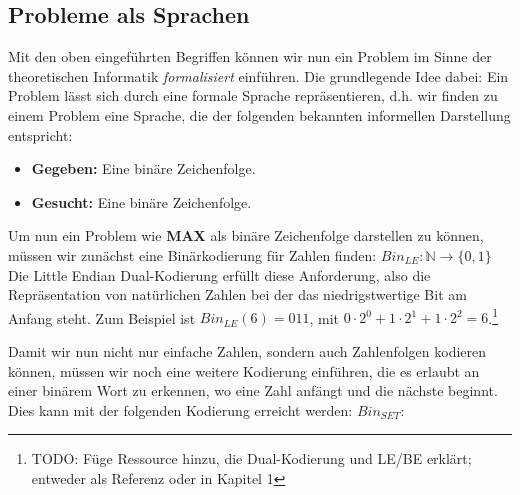 \subsection{Probleme als Sprachen}
Mit den oben eingeführten Begriffen können
wir nun ein Problem im Sinne der theoretischen Informatik
\emph{formalisiert} einführen.
Die grundlegende Idee dabei: Ein Problem lässt sich durch eine formale Sprache repräsentieren,
d.h. wir finden zu einem Problem eine Sprache, die der folgenden bekannten informellen
Darstellung entspricht:
\begin{itemize}
    \item \textbf{Gegeben:} Eine binäre Zeichenfolge. 
    \item \textbf{Gesucht:} Eine binäre Zeichenfolge.
\end{itemize}
Um nun ein Problem wie \textbf{MAX} als binäre Zeichenfolge darstellen zu können,
müssen wir zunächst eine Binärkodierung für Zahlen finden:
$Bin_{LE}: \mathbb{N} \rightarrow \{0,1\}$
Die Little Endian Dual-Kodierung erfüllt diese Anforderung,
also die Repräsentation von natürlichen Zahlen bei der
das niedrigstwertige Bit am Anfang steht.
Zum Beispiel ist $Bin_{LE}(6) = 011$, mit 
$
0 \cdot 2^0
+ 1 \cdot 2^1
+ 1 \cdot 2^2
= 6
$.\footnote{TODO: Füge Ressource hinzu, die Dual-Kodierung und LE/BE erklärt;
entweder als Referenz oder in Kapitel 1}

Damit wir nun nicht nur einfache Zahlen, sondern auch Zahlenfolgen kodieren können,
müssen wir noch eine weitere Kodierung einführen,
die es erlaubt an einer binärem Wort zu erkennen,
wo eine Zahl anfängt und die nächste beginnt.
Dies kann mit der folgenden Kodierung erreicht werden: 
$Bin_{SET}:$ 

